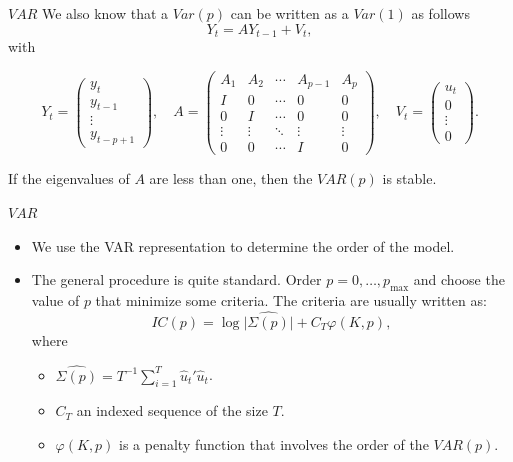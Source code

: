 \documentclass{beamer}
\newcommand{\?}{?`}
\begin{document}
\begin{frame}{$VAR$}
  We also know that a $Var(p)$ can be written as a $Var(1)$ as follows
    \begin{displaymath}
      Y_t=AY_{t-1} + V_t,
    \end{displaymath}
    with
    \begin{small}
    \begin{displaymath}
      Y_t=\left(
        \begin{array}{c}
          y_t \\
          y_{t-1} \\
          \vdots \\
          y_{t-p+1}
        \end{array}
        \right), \quad
        A=\left(
        \begin{array}{ccccc}
          A_1 & A_2 & \cdots & A_{p-1} & A_p \\
          I & 0 & \cdots & 0 & 0 \\
          0 & I & \cdots & 0 & 0 \\
          \vdots & \vdots & \ddots & \vdots & \vdots \\
          0 & 0 & \cdots & I & 0
        \end{array}
        \right), \quad
        V_t=\left(
        \begin{array}{c}
          u_t \\
          0 \\
          \vdots \\
          0
        \end{array}
        \right).
    \end{displaymath}
    \end{small}
   If the eigenvalues of  $A$ are less than one, then the $VAR(p)$ is stable.
\end{frame}

\begin{frame}{$VAR$}
  \begin{itemize}
  \item We use the VAR representation to determine the order of the model.

  \item The general procedure is quite standard. Order  $p=0,\ldots,p_{\max}$ and choose the value of $p$ that minimize some criteria.
  The criteria are usually written as:
     \begin{displaymath}
      IC(p)=\log \vert \hat{\Sigma(p)} \vert + C_T \varphi(K,p),
    \end{displaymath}
    where
    \begin{itemize}
      \item $\hat{\Sigma(p)}=T^{-1} \sum_{i=1}^T\hat{u}_t'\hat{u}_t$.
      \item $C_T$ an indexed sequence of the size  $T$.
      \item $\varphi(K,p)$ is a penalty function that involves the order of the $VAR(p)$.
    \end{itemize}
  \end{itemize}
\end{frame}
\end{document}
